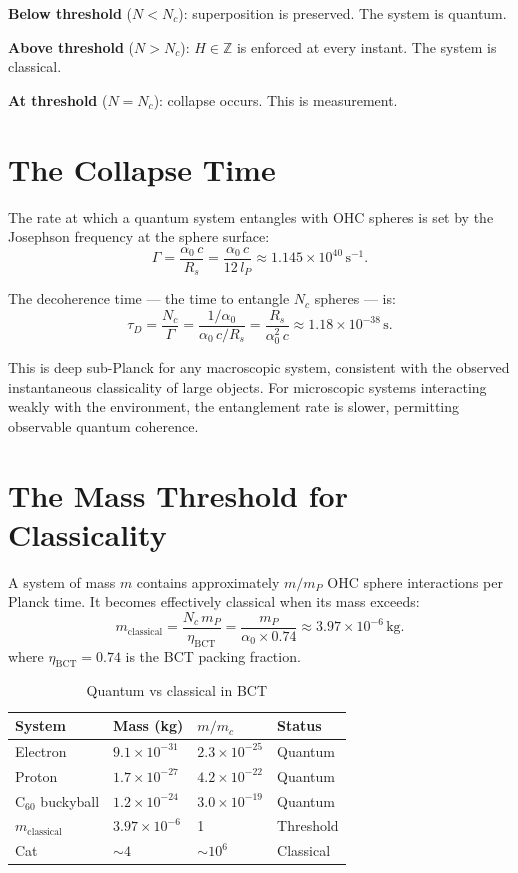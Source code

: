 \documentclass[aps,prl,twocolumn,superscriptaddress,showpacs]{revtex4-2}
\begin{document}
\textbf{Below threshold} ($N < N_c$): superposition is preserved. 
The system is quantum.

\textbf{Above threshold} ($N > N_c$): $H \in \mathbb{Z}$ is enforced 
at every instant. The system is classical.

\textbf{At threshold} ($N = N_c$): collapse occurs. This is measurement.

\section{The Collapse Time}

The rate at which a quantum system entangles with OHC spheres is set 
by the Josephson frequency at the sphere surface:
\begin{equation}
\Gamma = \frac{\alpha_0 \, c}{R_s} = \frac{\alpha_0 \, c}{12\,l_P} 
\approx 1.145 \times 10^{40}\,\mathrm{s}^{-1}.
\end{equation}

The decoherence time --- the time to entangle $N_c$ spheres --- is:
\begin{equation}
\tau_D = \frac{N_c}{\Gamma} = \frac{1/\alpha_0}{\alpha_0\,c/R_s} 
= \frac{R_s}{\alpha_0^2\,c} \approx 1.18 \times 10^{-38}\,\mathrm{s}.
\end{equation}

This is deep sub-Planck for any macroscopic system, consistent with 
the observed instantaneous classicality of large objects. For 
microscopic systems interacting weakly with the environment, the 
entanglement rate is slower, permitting observable quantum coherence.

\section{The Mass Threshold for Classicality}

A system of mass $m$ contains approximately $m/m_P$ OHC sphere 
interactions per Planck time. It becomes effectively classical when 
its mass exceeds:
\begin{equation}
m_\mathrm{classical} = \frac{N_c \, m_P}{\eta_\mathrm{BCT}} 
= \frac{m_P}{\alpha_0 \times 0.74} \approx 3.97 \times 10^{-6}\,\mathrm{kg}.
\end{equation}
where $\eta_\mathrm{BCT} = 0.74$ is the BCT packing fraction.

\begin{table}[h]
\centering
\caption{Quantum vs classical in BCT}
\begin{tabular}{llll}
\hline\hline
System & Mass (kg) & $m/m_c$ & Status \\
\hline
Electron & $9.1\times10^{-31}$ & $2.3\times10^{-25}$ & Quantum \\
Proton & $1.7\times10^{-27}$ & $4.2\times10^{-22}$ & Quantum \\
C$_{60}$ buckyball & $1.2\times10^{-24}$ & $3.0\times10^{-19}$ & Quantum \\
$m_\mathrm{classical}$ & $3.97\times10^{-6}$ & 1 & Threshold \\
Cat & $\sim 4$ & $\sim 10^6$ & Classical \\
\hline\hline
\end{tabular}
\end{table}
\end{document}
